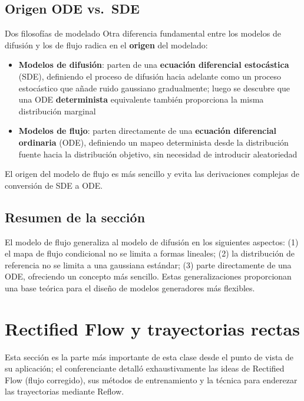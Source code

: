 \documentclass[a4paper]{article}
\begin{document}
\subsection{Origen ODE vs.\ SDE}

\begin{knowledgebox}{Dos filosofías de modelado}
Otra diferencia fundamental entre los modelos de difusión y los de flujo radica en el \textbf{origen} del modelado:
\begin{itemize}
    \item \textbf{Modelos de difusión}: parten de una \textbf{ecuación diferencial estocástica} (SDE), definiendo el proceso de difusión hacia adelante como un proceso estocástico que añade ruido gaussiano gradualmente; luego se descubre que una ODE \textbf{determinista} equivalente también proporciona la misma distribución marginal
    \item \textbf{Modelos de flujo}: parten directamente de una \textbf{ecuación diferencial ordinaria} (ODE), definiendo un mapeo determinista desde la distribución fuente hacia la distribución objetivo, sin necesidad de introducir aleatoriedad
\end{itemize}
El origen del modelo de flujo es más sencillo y evita las derivaciones complejas de conversión de SDE a ODE.
\end{knowledgebox}

\subsection{Resumen de la sección}

El modelo de flujo generaliza al modelo de difusión en los siguientes aspectos: (1) el mapa de flujo condicional no se limita a formas lineales; (2) la distribución de referencia no se limita a una gaussiana estándar; (3) parte directamente de una ODE, ofreciendo un concepto más sencillo. Estas generalizaciones proporcionan una base teórica para el diseño de modelos generadores más flexibles.
\section{Rectified Flow y trayectorias rectas}

Esta sección es la parte más importante de esta clase desde el punto de vista de su aplicación; el conferenciante detalló exhaustivamente las ideas de Rectified Flow (flujo corregido), sus métodos de entrenamiento y la técnica para enderezar las trayectorias mediante Reflow.
\end{document}
